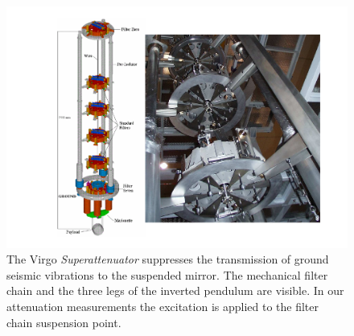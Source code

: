 \begin{figure}[t]
	\begin{center}
		\includegraphics[width=17cm]{./Sec_Suspensions/Figures/SAfig1.pdf}
			\caption{The Virgo \emph{Superattenuator} suppresses the transmission of ground seismic vibrations to the suspended mirror. The mechanical filter chain and the three legs of the inverted pendulum are visible. In our attenuation measurements the excitation is applied to the filter chain suspension point.}
\label{SAfig1}
	\end{center}
\end{figure}

